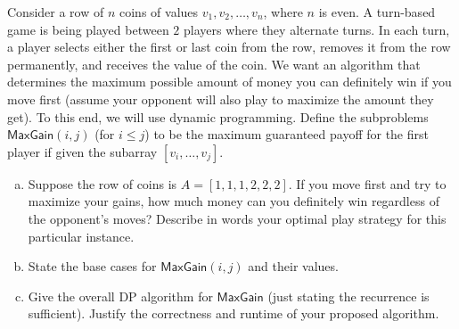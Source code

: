 \documentclass[11pt]{article}
\begin{document}
    \begin{tcolorbox}[title={Problem 3 (The Coin Game, 35 points)}] \setlength\parindent{1em}
        
    Consider a row of $n$ coins of values $v_1, v_2, \dots, v_n$, where $n$ is even. A turn-based game is being played between
    $2$ players where they alternate turns. In each turn, a player selects either the first or last coin from the
    row, removes it from the row permanently, and receives the value of the coin. We want an algorithm that
    determines the maximum possible amount of money you can definitely win if you move first (assume your
    opponent will also play to maximize the amount they get). To this end, we will use dynamic programming.
    Define the subproblems $\mathsf{MaxGain}(i, j)$ (for $i \leq j$) to be the maximum guaranteed payoff for the first player if given the subarray $[v_i,  \dots, v_j]$.
    \begin{enumerate}[(a)]
    \item Suppose the row of coins is $A=[1,1,1,2,2,2]$. If you move first and try to maximize your gains, how much money can you definitely win regardless
    of the opponent’s moves? Describe in words your optimal play strategy for this particular instance.
    \item State the base cases for $\mathsf{MaxGain}(i, j)$ and their values.
    \item Give the overall DP algorithm for  $\mathsf{MaxGain}$ (just stating the recurrence is sufficient). Justify the correctness and runtime of your proposed algorithm.

    \end{enumerate}
    \end{tcolorbox}
    
    
    \newpage

    
    
\end{document}
